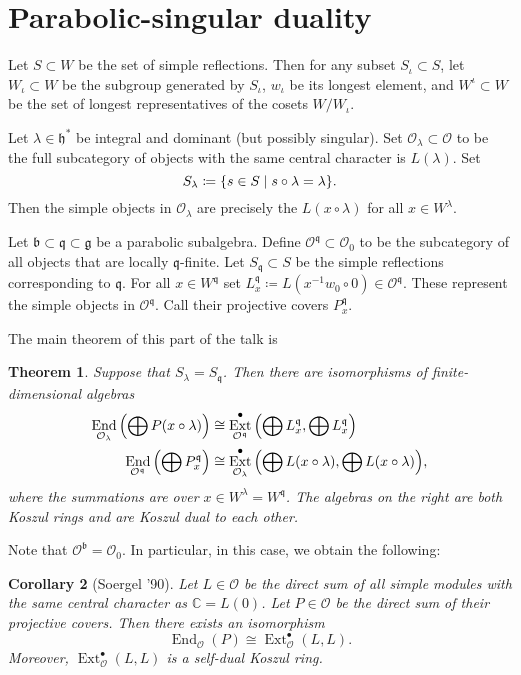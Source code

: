 \documentclass{amsart}
\newtheorem{thm}{Theorem}[section]
\newtheorem{cor}[thm]{Corollary}
\theoremstyle{definition}
\theoremstyle{remark}
\theoremstyle{plain}
\theoremstyle{definition}
\theoremstyle{remark}
\newcommand{\C}{\mathbb{C}}
\newcommand{\cO}{\mathcal{O}}
\newcommand{\g}{\mathfrak{g}}
\newcommand{\h}{\mathfrak{h}}
\renewcommand{\b}{\mathfrak{b}}
\newcommand{\mf}[1]{\mathfrak{#1}}
\DeclareMathOperator{\End}{End}
\DeclareMathOperator{\Ext}{Ext}
\begin{document}
\section{Parabolic-singular duality}%
\label{sec:parabolic_singular_duality}

Let $S \subset W$ be the set of simple reflections. Then for any subset $S_{\iota} \subset S$, let $W_{\iota} \subset W$ be the subgroup generated by $S_{\iota}$, $w_{\iota}$ be its longest element, and $W^{\iota} \subset W$ be the set of longest representatives of the cosets $W / W_{\iota}$.

Let $\lambda \in \h^*$ be integral and dominant (but possibly singular). Set $\cO_{\lambda} \subset \cO$ to be the full subcategory of objects with the same central character is $L(\lambda)$. Set
\[ S_{\lambda} \coloneqq \qty{s \in S \mid s \circ \lambda = \lambda}. \]
Then the simple objects in $\cO_{\lambda}$ are precisely the $L(x \circ \lambda)$ for all $x \in W^{\lambda}$.

Let $\b \subset \mf{q} \subset \g$ be a parabolic subalgebra. Define $\cO^{\mf{q}} \subset \cO_0$ to be the subcategory of all objects that are locally $\mf{q}$-finite. Let $S_{\mf{q}} \subset S$ be the simple reflections corresponding to $\mf{q}$. For all $x \in W^{\mf{q}}$ set $L_x^{\mf{q}} \coloneqq L(x^{-1} w_0 \circ 0) \in \cO^{\mf{q}}$. These represent the simple objects in $\cO^{\mf{q}}$. Call their projective covers $P_x^{\mf{q}}$.

The main theorem of this part of the talk is
\begin{thm}
    Suppose that $S_{\lambda} = S_{\mf{q}}$. Then there are isomorphisms of finite-dimensional algebras
    \begin{align*}
        \End_{\cO_{\lambda}} \qty(\bigoplus P(x \circ \lambda)) &\cong \Ext_{\cO^{\mf{q}}}^{\bullet}\qty(\bigoplus L_x^{\mf{q}}, \bigoplus L_x^{\mf{q}}) \\
        \End_{\cO^{\mf{q}}} \qty(\bigoplus P_x^{\mf{q}}) & \cong \Ext_{\cO_{\lambda}}^{\bullet} \qty(\bigoplus L(x \circ \lambda), \bigoplus L(x \circ \lambda)),
    \end{align*}
    where the summations are over $x \in W^{\lambda} = W^{\mf{q}}$. The algebras on the right are both Koszul rings and are Koszul dual to each other.
\end{thm}

Note that $\cO^{\b} = \cO_0$. In particular, in this case, we obtain the following:
\begin{cor}[Soergel '90]
    Let $L \in \cO$ be the direct sum of all simple modules with the same central character as $\C = L(0)$. Let $P \in \cO$ be the direct sum of their projective covers. Then there exists an isomorphism
    \[ \End_{\cO}(P) \cong \Ext_{\cO}^{\bullet}(L, L). \]
    Moreover, $\Ext_{\cO}^{\bullet}(L, L)$ is a self-dual Koszul ring.
\end{cor}
\end{document}

